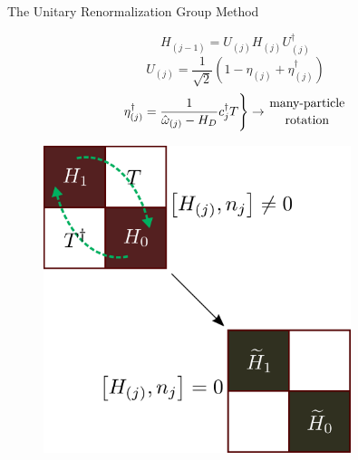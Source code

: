 \documentclass[aspectratio=169]{beamer}
\begin{document}
\begin{frame}[noframenumbering]{The Unitary Renormalization Group Method}
{\begin{minipage}{0.45\textwidth}
	\[H_{(j-1)} = U_{(j)} H_{(j)} U_{(j)}^\dagger\]
	\[U_{(j)} = \frac{1}{\sqrt 2}\left(1 - \eta_{(j)} + \eta_{(j)}^\dagger\right) \]
	\[ \eta^\dagger_{(j)} = \frac{1}{\hat \omega_{(j)} - H_D}c^\dagger_j T \Bigg \} \rightarrow {\text{many-particle}\atop{\text{rotation}}}\]
\end{minipage}
\hspace*{\fill}
\begin{minipage}{0.5\textwidth}
\begin{figure}
	\includegraphics[width=0.8\textwidth]{figures/urg_rot.pdf}
\end{figure}
\end{minipage}
}

\end{frame}
\end{document}
